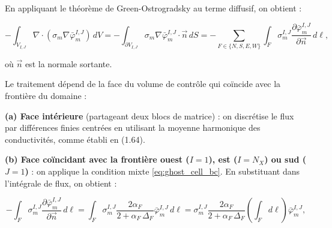 En appliquant le théorème de Green-Ostrogradsky au terme diffusif, on obtient :

\begin{equation}
-\int_{V_{I,J}} \nabla\cdot\left(\sigma_m\nabla \bar{\varphi}_m^{I,J}\right)\,dV
=-\int_{\partial V_{I,J}} \sigma_m\nabla \bar{\varphi}_m^{I,J}\cdot\vec{n}\,dS
=-\sum_{F\in\{N,S,E,W\}}\int_{F}\sigma_m^{I,J}\frac{\partial\bar{\varphi}_m^{I,J}}{\partial\vec{n}}\,d\ell,
\label{eq:ostro_applied}
\end{equation}

où $\vec{n}$ est la normale sortante.

Le traitement dépend de la face du volume de contrôle qui coïncide avec la frontière du domaine :

\textbf{(a) Face intérieure} (partageant deux blocs de matrice) : on discrétise le flux par différences finies centrées en utilisant la moyenne harmonique des conductivités, comme établi en (1.64).

\textbf{(b) Face coïncidant avec la frontière ouest ($I=1$), est ($I=N_X$) ou sud ($J=1$)} : on applique la condition mixte \eqref{eq:ghost_cell_bc}. En substituant dans l'intégrale de flux, on obtient :

\begin{equation}
-\int_{F}\sigma_m^{I,J}\frac{\partial\bar{\varphi}_m^{I,J}}{\partial\vec{n}}\,d\ell
=\int_{F}\sigma_m^{I,J}\frac{2\alpha_F}{2+\alpha_F\,\Delta_F}\bar{\varphi}_m^{I,J}\,d\ell
=\sigma_m^{I,J}\frac{2\alpha_F}{2+\alpha_F\,\Delta_F}\left(\int_F d\ell\right)\bar{\varphi}_m^{I,J},
\label{eq:boundary_flux_mixed}
\end{equation}


